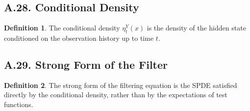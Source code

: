 \documentclass[11pt]{article}
\theoremstyle{definition}
\newtheorem{definition}{Definition}
\theoremstyle{remark}
\begin{document}
\subsection*{A.28. Conditional Density}
\begin{definition}
The conditional density \(\eta_t^Y(x)\) is the density of the hidden state conditioned on the observation history up to time \(t\).
\end{definition}

\subsection*{A.29. Strong Form of the Filter}
\begin{definition}
The strong form of the filtering equation is the SPDE satisfied directly by the conditional density, rather than by the expectations of test functions.
\end{definition}
\end{document}
